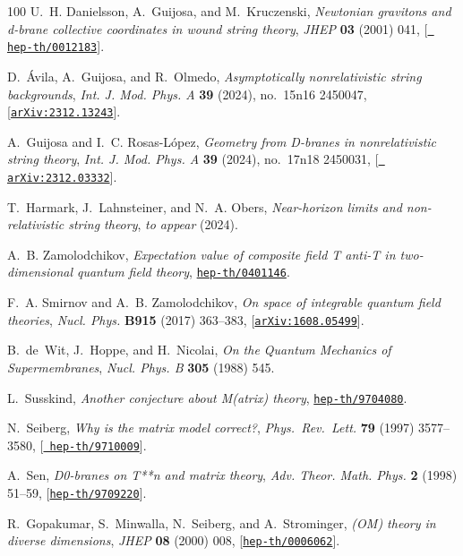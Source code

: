 \documentclass[11pt]{article}
\begin{document}
\begin{thebibliography}{100}
U.~H. Danielsson, A.~Guijosa, and M.~Kruczenski, {\it {Newtonian gravitons and
  d-brane collective coordinates in wound string theory}},  {\em JHEP} {\bf 03}
  (2001) 041, [\href{http://arxiv.org/abs/hep-th/0012183}{{\tt
  hep-th/0012183}}].

D.~\'Avila, A.~Guijosa, and R.~Olmedo, {\it {Asymptotically nonrelativistic
  string backgrounds}},  {\em Int. J. Mod. Phys. A} {\bf 39} (2024), no.~15n16
  2450047, [\href{http://arxiv.org/abs/2312.13243}{{\tt arXiv:2312.13243}}].

A.~Guijosa and I.~C. Rosas-L\'opez, {\it {Geometry from D-branes in
  nonrelativistic string theory}},  {\em Int. J. Mod. Phys. A} {\bf 39} (2024),
  no.~17n18 2450031, [\href{http://arxiv.org/abs/2312.03332}{{\tt
  arXiv:2312.03332}}].

T.~Harmark, J.~Lahnsteiner, and N.~A. Obers, {\it Near-horizon limits and
  non-relativistic string theory},  {\em to appear} (2024).

A.~B. Zamolodchikov, {\it {Expectation value of composite field T anti-T in
  two-dimensional quantum field theory}},
  \href{http://arxiv.org/abs/hep-th/0401146}{{\tt hep-th/0401146}}.

F.~A. Smirnov and A.~B. Zamolodchikov, {\it {On space of integrable quantum
  field theories}},  {\em Nucl. Phys.} {\bf B915} (2017) 363--383,
  [\href{http://arxiv.org/abs/1608.05499}{{\tt arXiv:1608.05499}}].

B.~de~Wit, J.~Hoppe, and H.~Nicolai, {\it {On the Quantum Mechanics of
  Supermembranes}},  {\em Nucl. Phys. B} {\bf 305} (1988) 545.

L.~Susskind, {\it {Another conjecture about M(atrix) theory}},
  \href{http://arxiv.org/abs/hep-th/9704080}{{\tt hep-th/9704080}}.

N.~Seiberg, {\it {Why is the matrix model correct?}},  {\em Phys.~Rev.~Lett.}
  {\bf 79} (1997) 3577--3580, [\href{http://arxiv.org/abs/hep-th/9710009}{{\tt
  hep-th/9710009}}].

A.~Sen, {\it {D0-branes on T**n and matrix theory}},  {\em Adv. Theor. Math.
  Phys.} {\bf 2} (1998) 51--59,
  [\href{http://arxiv.org/abs/hep-th/9709220}{{\tt hep-th/9709220}}].

R.~Gopakumar, S.~Minwalla, N.~Seiberg, and A.~Strominger, {\it {(OM) theory in
  diverse dimensions}},  {\em JHEP} {\bf 08} (2000) 008,
  [\href{http://arxiv.org/abs/hep-th/0006062}{{\tt hep-th/0006062}}].


\end{thebibliography}
\end{document}

